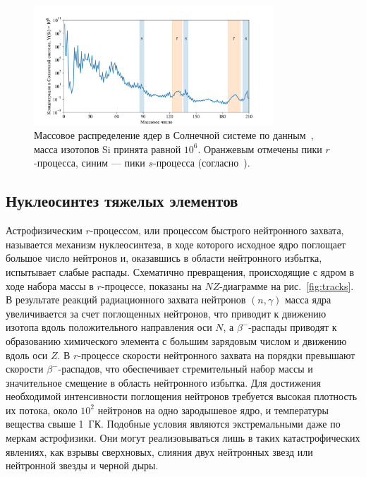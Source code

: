 \begin{figure}[!b]
  \centering
  \includegraphics[width=0.8\textwidth]{../pics/lodders.pdf}
  \caption{Массовое распределение ядер в Солнечной системе по данным~\cite{lodders2003}, масса изотопов Si принята равной $10^6$. Оранжевым отмечены пики $r$-процесса, синим --- пики $s$-процесса (согласно~\cite{cowan2021}).}
  \label{fig:lodders_vs_ame}
\end{figure}

\subsection{Нуклеосинтез тяжелых элементов}
Астрофизическим $r$-процессом, или процессом быстрого нейтронного захвата, называется механизм нуклеосинтеза, в ходе которого исходное ядро поглощает большое число нейтронов и, оказавшись в области нейтронного избытка, испытывает слабые распады. Схематично превращения, происходящие с ядром в ходе набора массы в $r$-процессе, показаны на $NZ$-диаграмме на рис.~\ref{fig:tracks}. В результате реакций радиационного захвата нейтронов $(n,\gamma)$ масса ядра увеличивается за счет поглощенных нейтронов, что приводит к движению изотопа вдоль положительного направления оси $N$, а $\beta^-$-распады приводят к образованию химического элемента с большим зарядовым числом и движению вдоль оси $Z$. В $r$-процессе скорости нейтронного захвата на порядки превышают скорости $\beta^-$-распадов, что обеспечивает стремительный набор массы и значительное смещение в область нейтронного избытка. Для достижения необходимой интенсивности поглощения нейтронов требуется высокая плотность их потока, около $10^2$ нейтронов на одно зародышевое ядро, и температуры вещества свыше 1~ГК. Подобные условия являются экстремальными даже по меркам астрофизики. Они могут реализовываться лишь в таких катастрофических явлениях, как взрывы сверхновых, слияния двух нейтронных звезд или нейтронной звезды и черной дыры.

